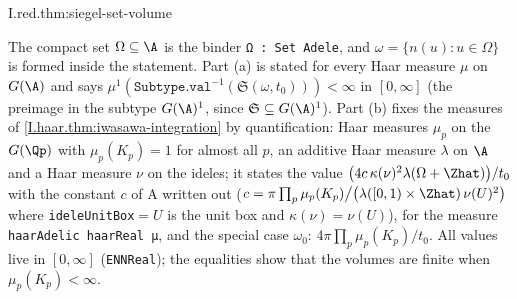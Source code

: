 \begin{tfformal}{I.red.thm:siegel-set-volume}
\begin{tffidelity}
The compact set $\Omega\subseteq\A$ is the binder \texttt{Ω : Set Adele}, and $\omega=\{n(u):u\in\Omega\}$ is formed inside the statement. Part (a) is stated for every Haar measure $\mu$ on $G(\A)$ and says $\mu^1(\texttt{Subtype.val}^{-1}(\mathfrak S(\omega,t_0)))<\infty$ in $[0,\infty]$ (the preimage in the subtype $G(\A)^1$, since $\mathfrak S\subseteq G(\A)^1$). Part (b) fixes the measures of \cref{I.haar.thm:iwasawa-integration} by quantification: Haar measures $\mu_p$ on the $G(\Qp)$ with $\mu_p(K_p)=1$ for almost all $p$, an additive Haar measure $\lambda$ on $\A$ and a Haar measure $\nu$ on the ideles; it states the value $\bigl(4c\,\kappa(\nu)^2\lambda(\Omega+\Zhat)\bigr)/t_0$ with the constant $c$ of A written out ($c=\pi\prod_p\mu_p(K_p)\big/\bigl(\lambda([0,1)\times\Zhat)\,\nu(U)^2\bigr)$ where \texttt{ideleUnitBox}$=U$ is the unit box and $\kappa(\nu)=\nu(U)$), for the measure \texttt{haarAdelic haarReal μ}, and the special case $\omega_0$: $4\pi\prod_p\mu_p(K_p)/t_0$. All values live in $[0,\infty]$ (\texttt{ENNReal}); the equalities show that the volumes are finite when $\mu_p(K_p)<\infty$.
\end{tffidelity}
\end{tfformal}
